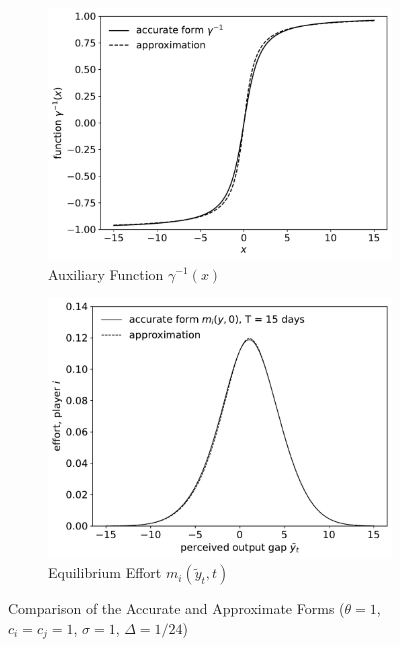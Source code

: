 \documentclass[mnsc]{informs3}
\begin{document}
\begin{figure}[!ht]
    \centering
    \begin{subfigure}{0.48\textwidth}
        \centering
        \includegraphics[width=\linewidth]{approx_invgamma.pdf}
        \caption{Auxiliary Function $\gamma^{-1}(x)$}
    \end{subfigure}
    \hfill
    \begin{subfigure}{0.48\textwidth}
        \centering
        \includegraphics[width=\linewidth]{approx_equi_effort.pdf}
        \caption{Equilibrium Effort $m_i(\tilde{y}_t, t)$}
    \end{subfigure}
    \caption{Comparison of the Accurate and Approximate Forms ($\theta = 1$, $c_i = c_j = 1$, $\sigma=1$, $\Delta=1/24$)}
    \label{fig-approximation}
\end{figure}
\end{document}
